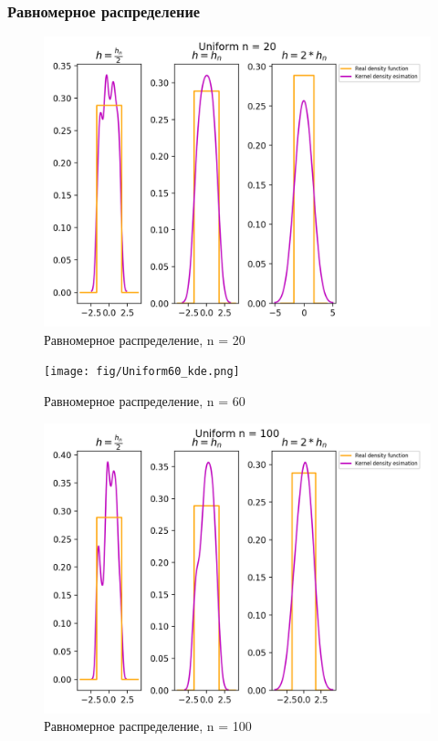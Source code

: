 \subsubsection{Равномерное распределение}
\begin{figure}[H]
	\begin{center}
		\includegraphics[scale=0.7]{fig/Uniform20_kde.png}
		\caption{Равномерное распределение, n = 20} 
		\label{pic:pic_name}
	\end{center}
\end{figure}

\begin{figure}[H]
	\begin{center}
		\texttt{[image: fig/Uniform60\_kde.png]}
		\caption{Равномерное распределение, n = 60} 
		\label{pic:pic_name}
	\end{center}
\end{figure}

\begin{figure}[H]
	\begin{center}
		\includegraphics[scale=0.7]{fig/Uniform100_kde.png}
		\caption{Равномерное распределение, n = 100} 
		\label{pic:pic_name}
	\end{center}
\end{figure}


